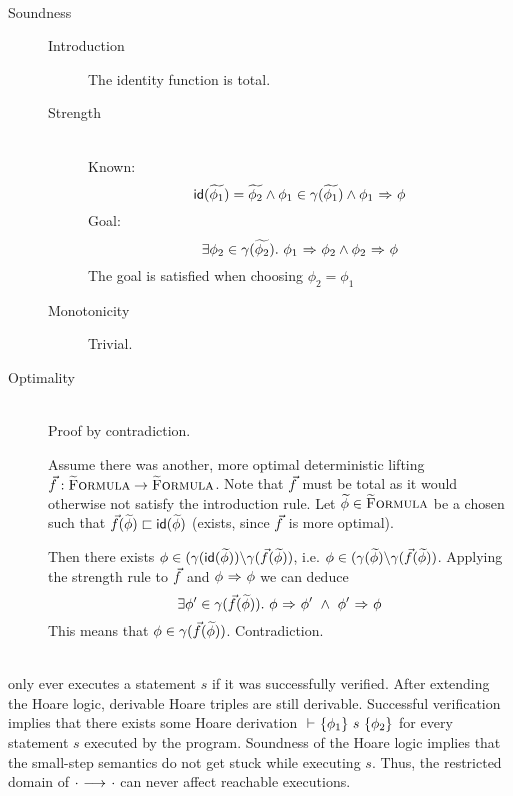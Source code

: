 \begin{proofatend}~
    \begin{description}
        \item[Soundness]
        \begin{description}
            \item[Introduction] The identity function is total.
            
            \item[Strength]~\\
            Known:
            $$\textup{\textmd{\textsf{id}}}(\widetilde{\phi_1}) = \widetilde{\phi_2} \wedge \phi_1 \in \gamma(\widetilde{\phi_1}) \wedge {\phi_1} \,\,{\Rightarrow}\,\, {\phi}$$
            Goal:
            $$\exists \phi_2 \in \gamma(\widetilde{\phi_2}).~ {\phi_1} \,\,{\Rightarrow}\,\, {\phi_2} \wedge {\phi_2} \,\,{\Rightarrow}\,\, {\phi}$$
            The goal is satisfied when choosing $\phi_2 = \phi_1$
            
            \item[Monotonicity] Trivial.
        \end{description}
        \item[Optimality]~\\
        Proof by contradiction.
        
        Assume there was another, more optimal deterministic lifting $\vec{f} : \textup{\textsc{\ensuremath{\widetilde{\text{F}}}ormula}} \rightarrow \textup{\textsc{\ensuremath{\widetilde{\text{F}}}ormula}}$.
        Note that $\vec{f}$ must be total as it would otherwise not satisfy the introduction rule.
        Let $\widetilde{\phi} \in \textup{\textsc{\ensuremath{\widetilde{\text{F}}}ormula}}$ be a chosen such that $\vec{f}(\widetilde{\phi}) \sqsubset \textup{\textmd{\textsf{id}}}(\widetilde{\phi})$ (exists, since $\vec{f}$ is more optimal).
        
        Then there exists $\phi \in (\gamma(\textup{\textmd{\textsf{id}}}(\widetilde{\phi})) \backslash \gamma(\vec{f}(\widetilde{\phi}))$, i.e. $\phi \in (\gamma(\widetilde{\phi}) \backslash \gamma(\vec{f}(\widetilde{\phi}))$.
        Applying the strength rule to $\vec{f}$ and ${\phi} \,\,{\Rightarrow}\,\, {\phi}$ we can deduce
        $$\exists \phi' \in \gamma(\vec{f}(\widetilde{\phi})).~ {\phi} \,\,{\Rightarrow}\,\, {\phi'} ~\wedge~ {\phi'} \,\,{\Rightarrow}\,\, {\phi}$$
        This means that $\phi \in \gamma(\vec{f}(\widetilde{\phi}))$.
        Contradiction.
    \end{description}
\end{proofatend}

\begin{proofatend}~\\
    \svl only ever executes a statement $s$ if it was successfully verified.
    After extending the Hoare logic, derivable Hoare triples are still derivable.
    Successful verification implies that there exists some Hoare derivation ${} \,\,{\vdash}\,\, \{{\phi_1}\} ~{s}~ \{{\phi_2}\}$ for every statement $s$ executed by the program.
    Soundness of the Hoare logic implies that the small-step semantics do not get stuck while executing $s$.
    Thus, the restricted domain of ${\cdot} \,\,{\longrightarrow^{}}\,\, {\cdot}$ can never affect reachable executions.
\end{proofatend}

